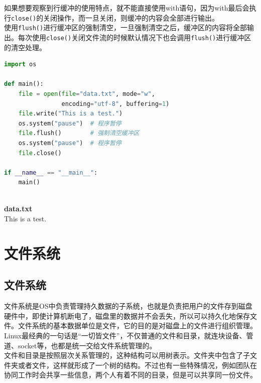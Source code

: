 如果想要观察到行缓冲的使用特点，就不能直接使用with语句，因为with最后会执行\lstinline|close()|的关闭操作，而一旦关闭，则缓冲的内容会全部进行输出。 \\

使用\lstinline|flush()|进行缓冲区的强制清空，一旦强制清空之后，缓冲区的内容将全部输出。每次使用\lstinline|close()|关闭文件流的时候默认情况下也会调用\lstinline|flush()|进行缓冲区的清空处理。

\begin{lstlisting}[language=Python, title=文件缓冲]
import os

def main():
    file = open(file="data.txt", mode="w",
                encoding="utf-8", buffering=1)
    file.write("This is a test.")
    os.system("pause")  # 程序暂停
    file.flush()        # 强制清空缓冲区
    os.system("pause")  # 程序暂停
    file.close()

if __name__ == "__main__":
    main()
\end{lstlisting}
    
\begin{tcolorbox}
     \\
    \textbf{data.txt} \\
    This is a test.
\end{tcolorbox}

\newpage

\section{文件系统}

\subsection{文件系统}

文件系统是OS中负责管理持久数据的子系统，也就是负责把用户的文件存到磁盘硬件中，即使计算机断电了，磁盘里的数据并不会丢失，所以可以持久化地保存文件。文件系统的基本数据单位是文件，它的目的是对磁盘上的文件进行组织管理。 \\

Linux最经典的一句话是``一切皆文件”，不仅普通的文件和目录，就连块设备、管道、socket等，也都是统一交给文件系统管理的。 \\

文件和目录是按照层次关系管理的，这种结构可以用树表示。文件夹中包含了子文件夹或者文件，这样就形成了一个树的结构。不过也有一些特殊情况，例如团队在协同工作时会共享一些信息，两个人有着不同的目录，但是可以共享同一份文件。 \\

